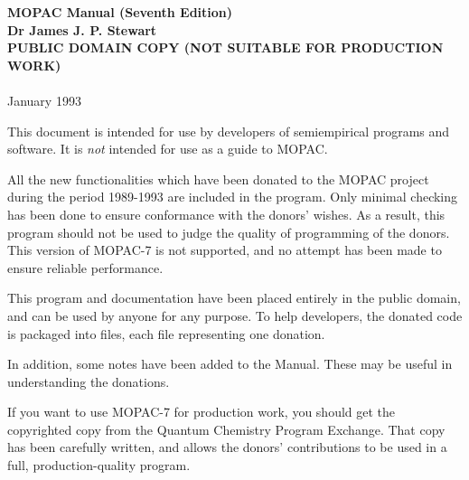 \documentclass[a4paper]{book}
\begin{document}
\begin{titlepage}
\begin{center}
{\huge\bf MOPAC Manual (Seventh Edition)}\\
\vfill
\vfill
{\LARGE\bf Dr James J. P. Stewart}\\
\vfill
{\Large\bf PUBLIC DOMAIN COPY (NOT SUITABLE FOR PRODUCTION WORK)\\
\ \\
}
\vfill
{\Large January 1993}
\end{center}
\end{titlepage}


                   


 This document is intended for use by developers of semiempirical
programs and software.  It is {\em not} intended for use as a guide
to MOPAC.

All the new functionalities which have been donated to the MOPAC project
during the period 1989-1993 are included in the program.  Only minimal
checking has been done to ensure conformance with the donors' wishes.
As a result, this program should not be used to judge the quality
of programming of the donors.  This version of MOPAC-7 is not supported, 
and no attempt has been made to ensure reliable performance.

This program and documentation have been placed entirely in the public
domain, and can be used by anyone for any purpose.  
To help developers, the donated code is packaged into files, each
file representing one donation.

In addition, some notes have been added to the Manual.  These may be useful
in understanding the donations.


If you want to use MOPAC-7 for production work, you should get the
copyrighted copy from the Quantum Chemistry Program Exchange.  
That copy has been carefully written, and allows the donors' contributions
to be used in a full, production-quality program.

\lhead[\fancyplain{}{ }]{\fancyplain{}{\bf\rightmark}}
\rhead[\fancyplain{}{\bf\leftmark}]{\fancyplain{}{ }}
\end{document}
